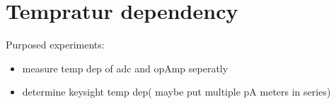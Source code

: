 
\chapter{Tempratur dependency}
\label{sec:TempDep}
Purposed experiments:
\begin{itemize}
	\item measure temp dep of adc and opAmp seperatly 
	\item determine keysight temp dep( maybe put multiple pA meters in series)
	
\end{itemize}